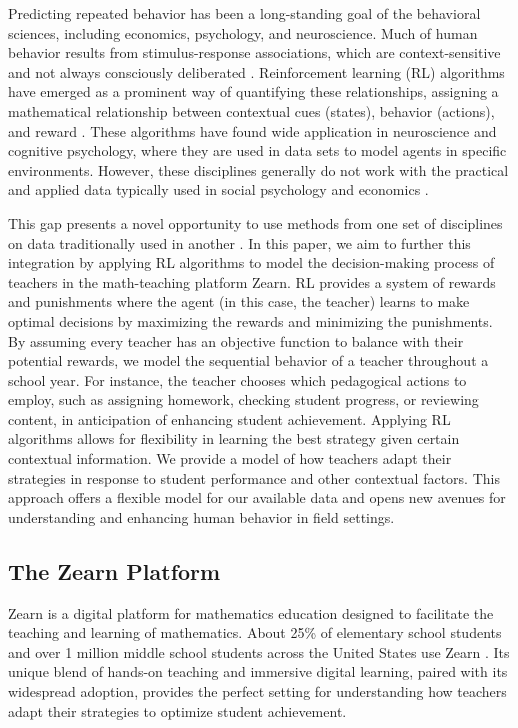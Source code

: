 \documentclass[
  number,
  preprint,
  3p,
  onecolumn]{elsarticle}
\begin{document}
Predicting repeated behavior has been a long-standing goal of the
behavioral sciences, including economics, psychology, and neuroscience.
Much of human behavior results from stimulus-response associations,
which are context-sensitive and not always consciously deliberated .
Reinforcement learning (RL) algorithms have emerged as a prominent way
of quantifying these relationships, assigning a mathematical
relationship between contextual cues (states), behavior (actions), and
reward \citep{sutton2018}. These algorithms have found wide application
in neuroscience and cognitive psychology, where they are used in data
sets to model agents in specific environments. However, these
disciplines generally do not work with the practical and applied data
typically used in social psychology and economics
\citep{buyalskaya2023}.

This gap presents a novel opportunity to use methods from one set of
disciplines on data traditionally used in another . In this paper, we
aim to further this integration by applying RL algorithms to model the
decision-making process of teachers in the math-teaching platform Zearn.
RL provides a system of rewards and punishments where the agent (in this
case, the teacher) learns to make optimal decisions by maximizing the
rewards and minimizing the punishments. By assuming every teacher has an
objective function to balance with their potential rewards, we model the
sequential behavior of a teacher throughout a school year. For instance,
the teacher chooses which pedagogical actions to employ, such as
assigning homework, checking student progress, or reviewing content, in
anticipation of enhancing student achievement. Applying RL algorithms
allows for flexibility in learning the best strategy given certain
contextual information. We provide a model of how teachers adapt their
strategies in response to student performance and other contextual
factors. This approach offers a flexible model for our available data
and opens new avenues for understanding and enhancing human behavior in
field settings.

\subsection{The Zearn Platform}\label{the-zearn-platform}

Zearn is a digital platform for mathematics education designed to
facilitate the teaching and learning of mathematics. About 25\% of
elementary school students and over 1 million middle school students
across the United States use Zearn \citep{post-weblog}. Its unique blend
of hands-on teaching and immersive digital learning, paired with its
widespread adoption, provides the perfect setting for understanding how
teachers adapt their strategies to optimize student achievement.
\end{document}
